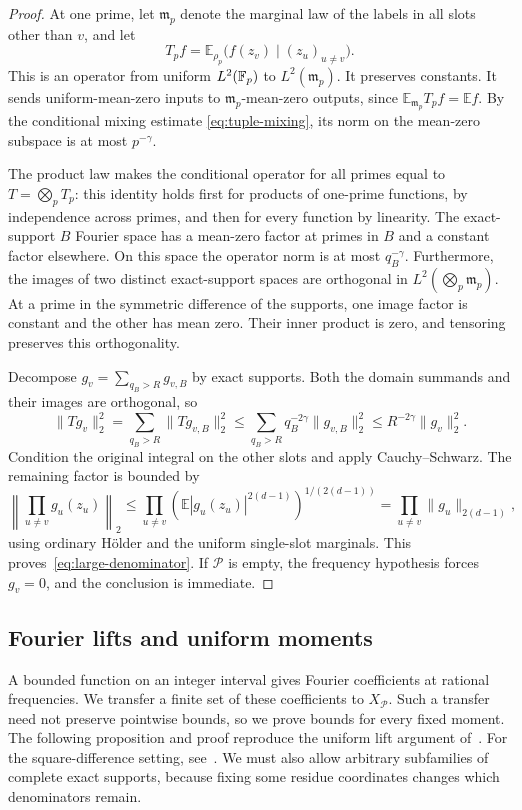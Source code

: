 \begin{proof}
At one prime, let \(\mathfrak m_p\) denote the marginal law of the labels in all
slots other than \(v\), and let
\[
 T_p f=\mathbb E_{\rho_p}\bigl(f(z_v)\mid(z_u)_{u\ne v}\bigr).
\]
This is an operator from uniform \(L^2(\mathbb F_p)\) to \(L^2(\mathfrak m_p)\).
It preserves constants.  It sends uniform-mean-zero inputs to
\(\mathfrak m_p\)-mean-zero outputs, since \(\mathbb E_{\mathfrak m_p}T_pf=\mathbb E f\).
By the conditional mixing estimate \eqref{eq:tuple-mixing}, its
norm on the mean-zero subspace is at most \(p^{-\gamma}\).

The product law makes the conditional operator for all primes equal
to \(T=\bigotimes_pT_p\): this identity holds first for products of
one-prime functions, by independence across primes, and then for every
function by linearity.  The exact-support \(B\) Fourier space has a
mean-zero factor at primes in \(B\) and a constant factor elsewhere.
On this space the operator norm is at most \(q_B^{-\gamma}\).
Furthermore, the images of two distinct exact-support spaces are
orthogonal in \(L^2(\bigotimes_p\mathfrak m_p)\).  At a prime in the symmetric
difference of the supports, one image factor is constant and the other
has mean zero.  Their inner product is zero, and tensoring preserves
this orthogonality.

Decompose \(g_v=\sum_{q_B>R}g_{v,B}\) by exact supports.  Both the
domain summands and their images are orthogonal, so
\[
 \|Tg_v\|_2^2
 =\sum_{q_B>R}\|Tg_{v,B}\|_2^2
 \le\sum_{q_B>R}q_B^{-2\gamma}\|g_{v,B}\|_2^2
 \le R^{-2\gamma}\|g_v\|_2^2.
\]
Condition the original integral on the other slots and apply
Cauchy--Schwarz.  The remaining factor is bounded by
\[
 \left\|\prod_{u\ne v}g_u(z_u)\right\|_2
 \le\prod_{u\ne v}
       \left(\mathbb E|g_u(z_u)|^{2(d-1)}\right)^{1/(2(d-1))}
 =\prod_{u\ne v}\|g_u\|_{2(d-1)},
\]
using ordinary H\"older and the uniform single-slot marginals.
This proves~\eqref{eq:large-denominator}.  If \(\mathcal P\) is empty, the frequency
hypothesis forces \(g_v=0\), and the conclusion is immediate.
\end{proof}

\subsection{Fourier lifts and uniform moments}

A bounded function on an integer interval gives Fourier coefficients at
rational frequencies.  We transfer a finite set of these coefficients
to \(X_{\mathcal P}\).  Such a transfer need not preserve pointwise
bounds, so we prove bounds for every fixed moment.  The following
proposition and proof reproduce the uniform lift argument
of~\cite[section ``Multilinear estimates and Fourier lifts'']{IntersectivePower}.
For the square-difference setting, see~\cite[Lemmas~5.2--5.3]{SquarePower}.
We must also allow
arbitrary subfamilies of complete exact supports, because fixing some
residue coordinates changes which denominators remain.

